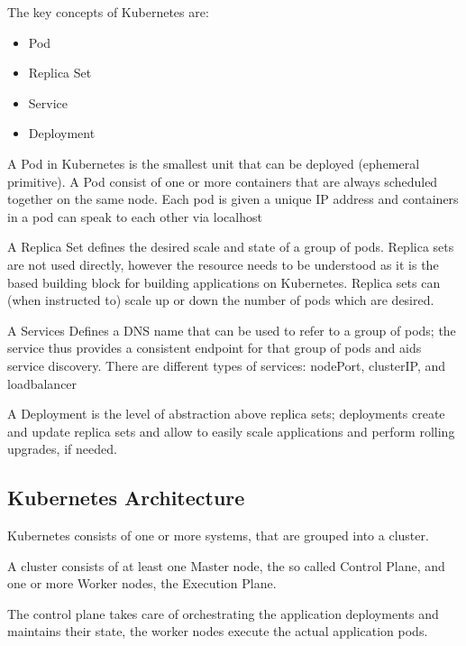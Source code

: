 The key concepts of Kubernetes are:
\begin{itemize}
\item Pod
\item Replica Set
\item Service
\item Deployment
\end{itemize}

A Pod in Kubernetes is the smallest unit that can be deployed (ephemeral primitive). A Pod consist of one or more containers that are always scheduled together on the same node. Each pod is given a unique IP address and containers in a pod can speak to each other via localhost

A Replica Set defines the desired scale and state of a group of pods. Replica sets are not used directly, however the resource needs to be understood as it is the based building block for building applications on Kubernetes. Replica sets can (when instructed to) scale up or down the number of pods which are desired.

A Services Defines a DNS name that can be used to refer to a group of pods; the service thus provides a consistent endpoint for that group of pods and aids service discovery. There are different types of services: nodePort, clusterIP, and loadbalancer

A Deployment is the level of abstraction above replica sets; deployments create and update replica sets and allow to easily scale applications and perform rolling upgrades, if needed.

\subsection{Kubernetes Architecture}

Kubernetes consists of one or more systems, that are grouped into a cluster.

A cluster consists of at least one Master node, the so called Control Plane, and one or more Worker nodes, the Execution Plane.

The control plane takes care of orchestrating the application deployments and maintains their state, the worker nodes execute the actual application pods.
